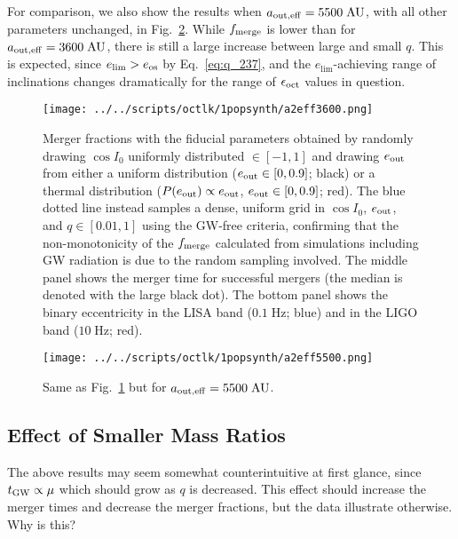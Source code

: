 \documentclass[
        fleqn,
        usenatbib,
    ]{mnras}
\begin{document}
For comparison, we also show the results when $a_{\rm out, eff} =
5500\;\mathrm{AU}$, with all other parameters unchanged, in
Fig.~\ref{fig:popsynth5500}. While $f_{\rm merge}$ is lower than for $a_{\rm
out, eff} = 3600\;\mathrm{AU}$, there is still a large increase between large
and small $q$. This is expected, since $e_{\lim} > e_{\rm os}$ by
Eq.~\eqref{eq:q_237}, and the $e_{\lim}$-achieving range of inclinations changes
dramatically for the range of $\epsilon_{\rm oct}$ values in question.
\begin{figure}
    \centering
    \texttt{[image: ../../scripts/octlk/1popsynth/a2eff3600.png]}
    \caption{Merger fractions with the fiducial parameters obtained by randomly
    drawing $\cos I_0$ uniformly distributed $\in [-1, 1]$ and drawing $e_{\rm
    out}$ from either a uniform distribution ($e_{\rm out} \in [0, 0.9]$; black)
    or a thermal distribution ($P(e_{\rm out}) \propto e_{\rm out}$, $e_{\rm
    out} \in [0, 0.9]$; red). The blue dotted line instead samples a dense,
    uniform grid in $\cos I_0$, $e_{\rm out}$, and $q \in [0.01, 1]$ using the
    GW-free criteria, confirming that the non-monotonicity of the $f_{\rm
    merge}$ calculated from simulations including GW radiation is due to the
    random sampling involved. The middle panel shows the merger time for
    successful mergers (the median is denoted with the large black dot). The
    bottom panel shows the binary eccentricity in the LISA band
    ($0.1\;\mathrm{Hz}$; blue) and in the LIGO band ($10 \;\mathrm{Hz}$; red).
    }\label{fig:popsynth}
\end{figure}
\begin{figure}
    \centering
    \texttt{[image: ../../scripts/octlk/1popsynth/a2eff5500.png]}
    \caption{Same as Fig.~\ref{fig:popsynth} but for $a_{\rm out, eff} =
    5500\;\mathrm{AU}$. }\label{fig:popsynth5500}
\end{figure}

\subsection{Effect of Smaller Mass Ratios}

The above results may seem somewhat counterintuitive at first glance, since
$t_{\rm GW} \propto \mu$ which should grow as $q$ is decreased. This effect
should increase the merger times and decrease the merger fractions, but the data
illustrate otherwise. Why is this?
\end{document}
